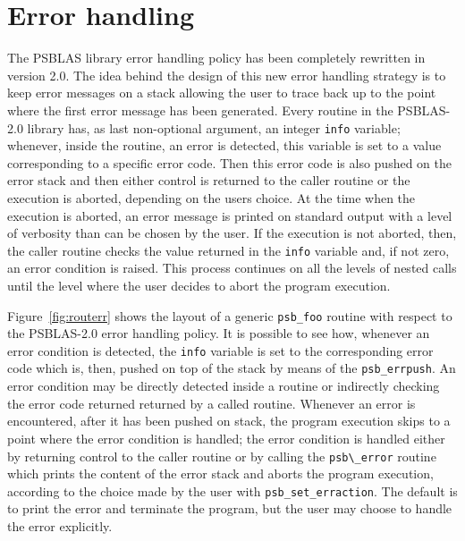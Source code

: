 

\section{Error handling}

The PSBLAS library error handling policy has been completely rewritten
in version 2.0. The idea behind the design of this new error handling
strategy is to keep error messages on a stack allowing the user to
trace back up to the point where the first error message has been
generated. Every routine in the PSBLAS-2.0 library has, as last
non-optional argument, an integer \verb|info| variable; whenever,
inside the routine, an error is detected, this variable is set to a
value corresponding to a specific error code. Then this error code is
also pushed on the error stack and then either control is returned to
the caller routine or the execution is aborted, depending on the users
choice. At the time when the execution is aborted, an error message is
printed on standard output with a level of verbosity than can be
chosen by the user. If the execution is not aborted, then, the caller
routine checks the value returned in the \verb|info| variable and, if
not zero, an error condition is raised. This process continues on all the
levels of nested calls until the level where the user decides to abort
the program execution.

Figure~\ref{fig:routerr} shows the layout of a generic \verb|psb_foo|
routine with respect to the PSBLAS-2.0 error handling policy. It is
possible to see how, whenever an error condition is detected, the
\verb|info| variable is set to the corresponding error code which is,
then, pushed on top of the stack by means of the
\verb|psb_errpush|. An error condition may be directly detected inside
a routine or indirectly checking the error code returned returned by a
called routine. Whenever an error is encountered, after it has been
pushed on stack, the program execution skips to a point where the
error condition is handled; the error condition is handled either by
returning control to the caller routine or by calling the
\verb|psb\_error| routine which prints the content of the error stack
and aborts the program execution, according to the choice made by the
user with \verb|psb_set_erraction|. The default is to print the error
and terminate the program, but the user may choose to handle the error
explicitly. 

